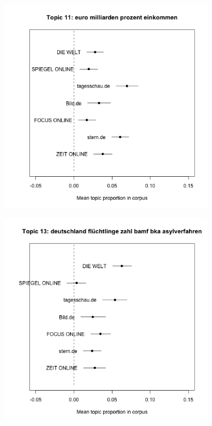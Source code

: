 \documentclass[12pt,a4paper,notitlepage]{article}
\begin{document}
\begin{figure}[H]
\begin{center}
\begin{subfigure}[normla]{0.3\textwidth}
		\end{subfigure}
				\begin{subfigure}[normla]{0.3\textwidth}
			\includegraphics[width=\textwidth]{../figs/estimate_effect11.png}
		\end{subfigure}
				\begin{subfigure}[normla]{0.3\textwidth}
			\includegraphics[width=\textwidth]{../figs/estimate_effect13.png}

\end{subfigure}
\end{center}
\end{figure}
\end{document}
